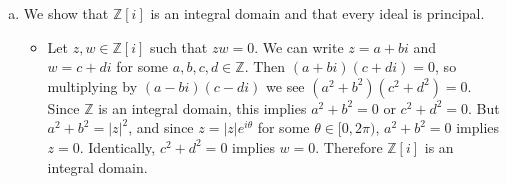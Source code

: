 \documentclass{article}
\begin{document}
\begin{Answer}
\begin{enumerate}[(a)]
{%
    }
    \item{
      We show that $\mathbb{Z}[i]$ is an integral domain and that
      every ideal is principal.
      \begin{itemize}
        \item{
          Let $z, w \in \mathbb{Z}[i]$ such that
          $zw = 0$. We can write $z = a + bi$ and $w = c + di$ for
          some $a, b, c, d \in \mathbb{Z}$.
          Then $(a + bi)(c + di) = 0$, so multiplying by
          $(a - bi)(c - di)$ we see $(a^2 + b^2)(c^2 + d^2) = 0$.
          Since $\mathbb{Z}$ is an integral domain, this implies
          $a^2 + b^2 = 0$ or $c^2 + d^2 = 0$. But $a^2 + b^2 = |z|^2$,
          and since $z = |z|e^{i \theta}$ for some
          $\theta \in [ 0, 2\pi )$, $a^2 + b^2 = 0$ implies $z = 0$.
          Identically, $c^2 + d^2 = 0$ implies $w = 0$. Therefore
          $\mathbb{Z}[i]$ is an integral domain.
}
\end{itemize}}
\end{enumerate}
\end{Answer}
\end{document}
